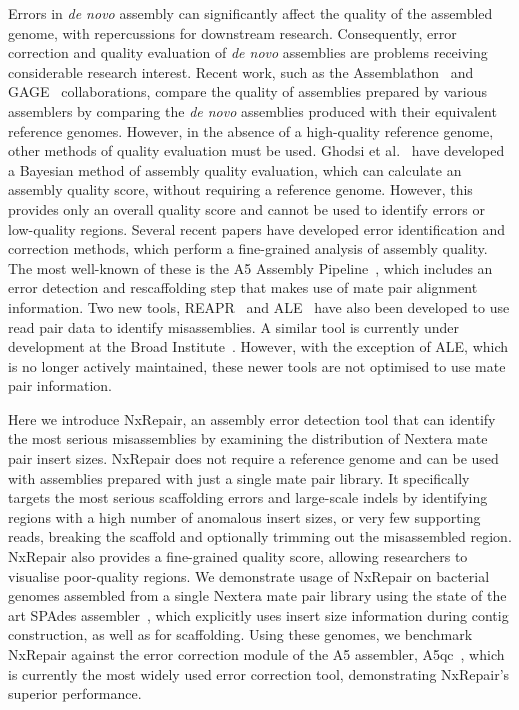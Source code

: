 Errors in \textit{de novo} assembly can significantly affect the quality of the assembled genome, with repercussions for downstream research. Consequently, error correction and quality evaluation of \textit{de novo} assemblies are problems receiving considerable research interest. Recent work, such as the Assemblathon~\cite{Bradnam2013} and GAGE~\cite{Salzberg2012} collaborations, compare the quality of assemblies prepared by various assemblers by comparing the \textit{de novo} assemblies produced with their equivalent reference genomes. However, in the absence of a high-quality reference genome, other methods of quality evaluation must be used. Ghodsi et al.~\cite{Ghodsi2013} have developed a Bayesian method of assembly quality evaluation, which can calculate an assembly quality score, without requiring a reference genome. However, this provides only an overall quality score and cannot be used to identify errors or low-quality regions. Several recent papers have developed error identification and correction methods, which perform a fine-grained analysis of assembly quality. The most well-known of these is the A5 Assembly Pipeline~\cite{Coil2014, tritt2012}, which includes an error detection and rescaffolding step that makes use of mate pair alignment information. Two new tools, REAPR~\cite{Hunt2013} and ALE~\cite{Clark2013} have also been developed to use read pair data to identify misassemblies. A similar tool is currently under development at the Broad Institute~\cite{pilon2014}. However, with the exception of ALE, which is no longer actively maintained, these newer tools are not optimised to use mate pair information.  

Here we introduce NxRepair, an assembly error detection tool that can identify the most serious misassemblies by examining the distribution of Nextera mate pair insert sizes. NxRepair does not require a reference genome and can be used with assemblies prepared with just a single mate pair library. It specifically targets the most serious scaffolding errors and large-scale indels by identifying regions with a high number of anomalous insert sizes, or very few supporting reads, breaking the scaffold and optionally trimming out the misassembled region. NxRepair also provides a fine-grained quality score, allowing researchers to visualise poor-quality regions. We demonstrate usage of NxRepair on bacterial genomes assembled from a single Nextera mate pair library using the state of the art SPAdes assembler~\cite{Bankevich2012}, which explicitly uses insert size information during contig construction, as well as for scaffolding. Using these genomes, we benchmark NxRepair against the error correction module of the A5 assembler, A5qc~\cite{tritt2012}, which is currently the most widely used error correction tool, demonstrating NxRepair's superior performance.

